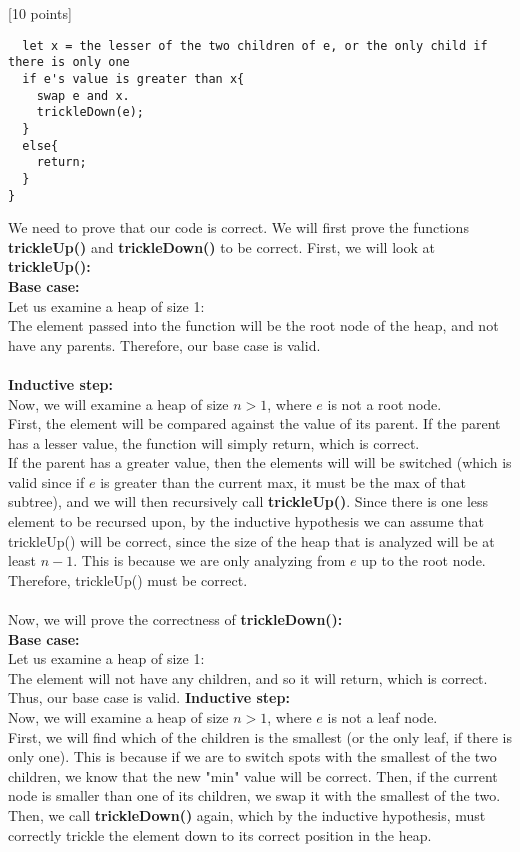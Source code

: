 \documentclass[12pt]{article}
\newcounter{ques}
\newenvironment{question}{\stepcounter{ques}{\noindent\bf Question \arabic{ques}:}}{\vspace{5mm}}
\begin{document}
\begin{question}[10 points]
\begin{verbatim}
  let x = the lesser of the two children of e, or the only child if there is only one
  if e's value is greater than x{
    swap e and x.
    trickleDown(e);
  }
  else{
    return;
  }
}
\end{verbatim}
We need to prove that our code is correct. We will first prove the functions \textbf{trickleUp()} and \textbf{trickleDown()} to be correct. First, we will look at \textbf{trickleUp():}\\
\textbf{Base case:}\\
Let us examine a heap of size 1:\\
The element passed into the function will be the root node of the heap, and not have any parents. Therefore, our base case is valid.\\\\
\textbf{Inductive step:}\\
Now, we will examine a heap of size $n>1$, where $e$ is not a root node.\\
First, the element will be compared against the value of its parent. If the parent has a lesser value, the function will simply return, which is correct.\\
If the parent has a greater value, then the elements will will be switched (which is valid since if $e$ is greater than the current max, it must be the max of that subtree), and we will then recursively call \textbf{trickleUp()}. Since there is one less element to be recursed upon, by the inductive hypothesis we can assume that trickleUp() will be correct, since the size of the heap that is analyzed will be at least $n-1$. This is because we are only analyzing from $e$ up to the root node.\\
Therefore, trickleUp() must be correct.\\\\
Now, we will prove the correctness of \textbf{trickleDown():}\\
\textbf{Base case:}\\
Let us examine a heap of size 1:\\
The element will not have any children, and so it will return, which is correct. Thus, our base case is valid.
\textbf{Inductive step:}\\
Now, we will examine a heap of size $n>1$, where $e$ is not a leaf node.\\
First, we will find which of the children is the smallest (or the only leaf, if there is only one). This is because if we are to switch spots with the smallest of the two children, we know that the new "min" value will be correct. Then, if the current node is smaller than one of its children, we swap it with the smallest of the two. Then, we call \textbf{trickleDown()} again, which by the inductive hypothesis, must correctly trickle the element down to its correct position in the heap.\\\\

\end{question}
\end{document}
